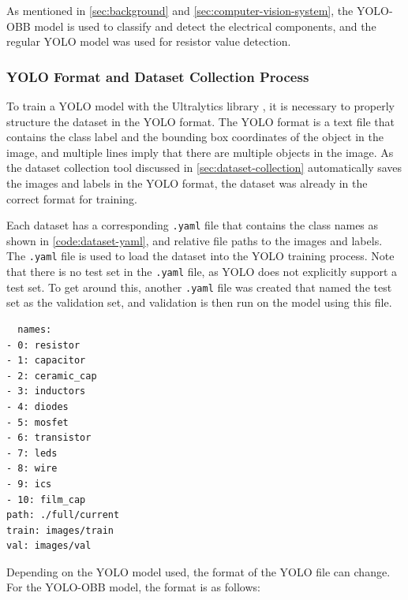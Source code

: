 
As mentioned in \autoref{sec:background} and \autoref{sec:computer-vision-system}, the YOLO-OBB model \cite{yolov8} is used to classify and detect the electrical components, and the regular YOLO model was used for resistor value detection.

\subsubsection{YOLO Format and Dataset Collection Process}
To train a YOLO model with the Ultralytics library \cite{yolov8}, it is necessary to properly structure the dataset in the YOLO format. The YOLO format is a text file that contains the class label and the bounding box coordinates of the object in the image, and multiple lines imply that there are multiple objects in the image. As the dataset collection tool discussed in \autoref{sec:dataset-collection} automatically saves the images and labels in the YOLO format, the dataset was already in the correct format for training.

Each dataset has a corresponding \texttt{.yaml} file that contains the class names as shown in \autoref{code:dataset-yaml}, and relative file paths to the images and labels. The \texttt{.yaml} file is used to load the dataset into the YOLO training process. Note that there is no test set in the \texttt{.yaml} file, as YOLO does not explicitly support a test set. To get around this, another \texttt{.yaml} file was created that named the test set as the validation set, and validation is then run on the model using this file.

\begin{minipage}[H]{\textwidth}
  \centering
  \begin{verbatim}
  names:
- 0: resistor
- 1: capacitor
- 2: ceramic_cap
- 3: inductors
- 4: diodes
- 5: mosfet
- 6: transistor
- 7: leds
- 8: wire
- 9: ics
- 10: film_cap
path: ./full/current
train: images/train
val: images/val
  \end{verbatim}
  \label{code:dataset-yaml}
\end{minipage}

Depending on the YOLO model used, the format of the YOLO file can change. For the YOLO-OBB model, the format is as follows:

\begin{center}
\end{center}

